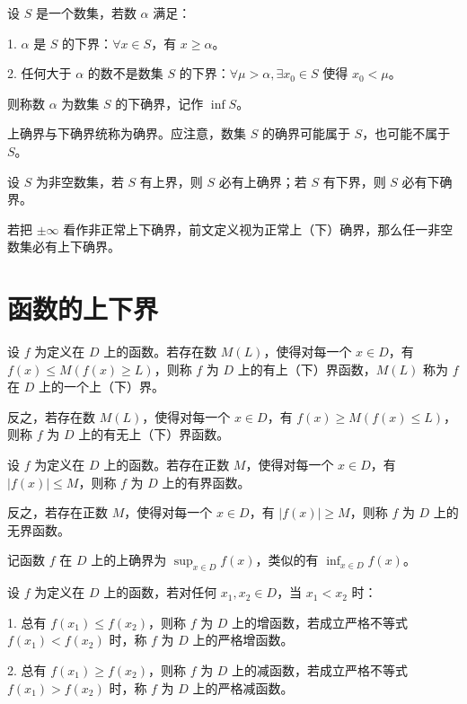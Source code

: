 \begin{definition}[下确界]
	设 $S$ 是一个数集，若数 $\alpha$ 满足：
	
	1. $\alpha$ 是 $S$ 的下界：$\forall x\in S$，有 $x\geqslant \alpha$。
	
	2. 任何大于 $\alpha$ 的数不是数集 $S$ 的下界：$\forall \mu>\alpha, \exists x_0\in S$ 使得 $x_0<\mu$。
	
	则称数 $\alpha$ 为数集 $S$ 的下确界，记作 $\inf S$。
\end{definition}

上确界与下确界统称为确界。应注意，数集 $S$ 的确界可能属于 $S$，也可能不属于 $S$。

\begin{theorem}[确界原理]
	设 $S$ 为非空数集，若 $S$ 有上界，则 $S$ 必有上确界；若 $S$ 有下界，则 $S$ 必有下确界。
\end{theorem}

若把 $\pm \infty$ 看作非正常上下确界，前文定义视为正常上（下）确界，那么任一非空数集必有上下确界。

\section{函数的上下界}

\begin{definition}
	设 $f$ 为定义在 $D$ 上的函数。若存在数 $M(L)$，使得对每一个 $x\in D$，有 $f(x)\leqslant M(f(x) \ge L)$，则称 $f$ 为 $D$ 上的有上（下）界函数，$M(L)$ 称为 $f$ 在 $D$ 上的一个上（下）界。

	反之，若存在数 $M(L)$，使得对每一个 $x\in D$，有 $f(x)\geqslant M(f(x) \leqslant L)$，则称 $f$ 为 $D$ 上的有无上（下）界函数。
\end{definition}

\begin{definition}
	设 $f$ 为定义在 $D$ 上的函数。若存在正数 $M$，使得对每一个 $x\in D$，有 $|f(x)|\leqslant M$，则称 $f$ 为 $D$ 上的有界函数。

	反之，若存在正数 $M$，使得对每一个 $x\in D$，有 $|f(x)|\ge M$，则称 $f$ 为 $D$ 上的无界函数。
\end{definition}

记函数 $f$ 在 $D$ 上的上确界为 $\sup_{x\in D} f(x)$，类似的有 $\inf_{x\in D} f(x)$。

\begin{definition}
	设 $f$ 为定义在 $D$ 上的函数，若对任何 $x_1,x_2\in D$，当 $x_1<x_2$ 时：

	1. 总有 $f(x_1) \leqslant f(x_2)$，则称 $f$ 为 $D$ 上的增函数，若成立严格不等式 $f(x_1) < f(x_2)$ 时，称 $f$ 为 $D$ 上的严格增函数。

	2. 总有 $f(x_1) \geqslant f(x_2)$，则称 $f$ 为 $D$ 上的减函数，若成立严格不等式 $f(x_1) > f(x_2)$ 时，称 $f$ 为 $D$ 上的严格减函数。
\end{definition}

